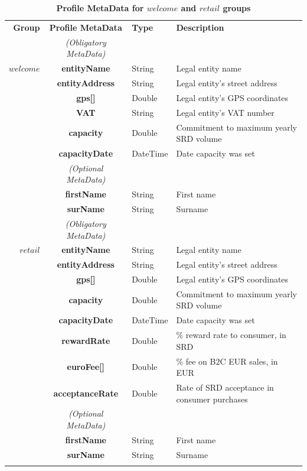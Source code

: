 \setlength{\tabcolsep}{10pt}
\begin{table}[H]
\begin{centering}
\small
{
\begin{tabular}{ r | c | l | l }
\textbf{Group}	& {\bf Profile MetaData} & {\bf Type} & {\bf Description} \\
\Xhline{1.5pt}
			& \emph{(Obligatory MetaData)} & & \\
\cline{2-2}
$welcome$	& {\bf entityName}			&String	& Legal entity name \\
			& {\bf entityAddress}			&String	& Legal entity's street address \\
			& {\bf gps[]}				&Double	& Legal entity's GPS coordinates \\			
			& {\bf VAT}				&String	& Legal entity's VAT number \\
			& {\bf capacity}				&Double	& Commitment to maximum yearly SRD volume \\
			& {\bf capacityDate}			&DateTime & Date capacity was set \\
\cline{2-2}
			 & \emph{(Optional MetaData)}& & \\
\cline{2-2}
			& {\bf firstName}			&String	& First name \\
			& {\bf surName}			&String	& Surname \\
\Xhline{1.5pt}
			& \emph{(Obligatory MetaData)} & & \\
\cline{2-2}
$retail$		& {\bf entityName}			&String	& Legal entity name \\
			& {\bf entityAddress}			&String	& Legal entity's street address \\
			& {\bf gps[]}				&Double	& Legal entity's GPS coordinates \\			
			& {\bf capacity}				&Double	& Commitment to maximum yearly SRD volume \\
			& {\bf capacityDate}			&DateTime & Date capacity was set \\
			& {\bf rewardRate}			&Double	& \% reward rate to consumer, in SRD \\
			& {\bf euroFee[]}			&Double	& \% fee on B2C EUR sales, in EUR \\
			& {\bf acceptanceRate}		&Double	& Rate of SRD acceptance in consumer purchases\\
\cline{2-2}
			 & \emph{(Optional MetaData)}& & \\
\cline{2-2}
			& {\bf firstName	}			&String	& First name \\
			& {\bf surName}			&String	& Surname \\
\Xhline{1.5pt}
\end{tabular}
}
\caption{\small\textbf{Profile MetaData for $welcome$ and $retail$ groups}}
\label{tab:ProfileMetaData1}
\end{centering}
\end{table}


